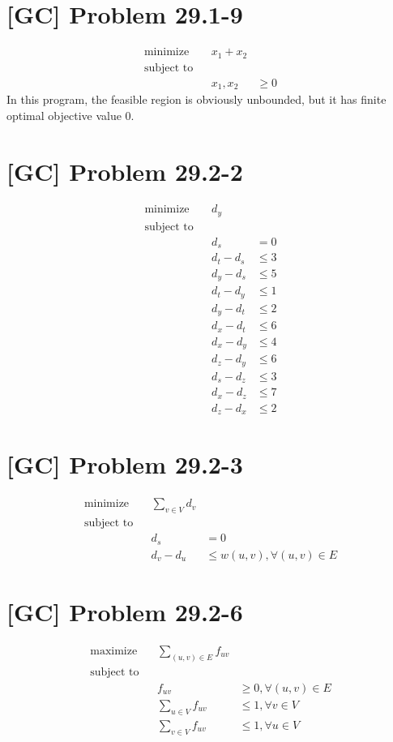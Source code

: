 \documentclass[a4paper,11pt,twocolumn]{article}
\begin{document}
  \section{[GC] Problem 29.1-9}
  \begin{align*}
    \text{minimize} && x_1 + x_2 \\
    \text{subject to} \\
    && x_1, x_2 & \geq 0
  \end{align*}
  In this program, the feasible region is obviously unbounded, but it has finite optimal objective value $0$.

  \section{[GC] Problem 29.2-2}
  \begin{align*}
    \text{minimize} && d_y \\
    \text{subject to} \\
    && d_s & = 0 \\
    && d_t - d_s & \leq 3 \\
    && d_y - d_s & \leq 5 \\
    && d_t - d_y & \leq 1 \\
    && d_y - d_t & \leq 2 \\
    && d_x - d_t & \leq 6 \\
    && d_x - d_y & \leq 4 \\
    && d_z - d_y & \leq 6 \\
    && d_s - d_z & \leq 3 \\
    && d_x - d_z & \leq 7 \\
    && d_z - d_x & \leq 2
  \end{align*}

  \section{[GC] Problem 29.2-3}
  \begin{align*}
    \text{minimize} && \sum_{v \in V} d_v \\
    \text{subject to} \\
    && d_s & = 0 \\
    && d_v - d_u & \leq w(u, v), \forall (u, v) \in E
  \end{align*}

  \section{[GC] Problem 29.2-6}
  \begin{align*}
    \text{maximize} && \sum_{(u, v) \in E} f_{uv} \\
    \text{subject to} \\
    && f_{uv} & \geq 0, \forall (u, v) \in E \\
    && \sum_{u \in V} f_{uv} & \leq 1, \forall v \in V \\
    && \sum_{v \in V} f_{uv} & \leq 1, \forall u \in V
  \end{align*}
\end{document}
